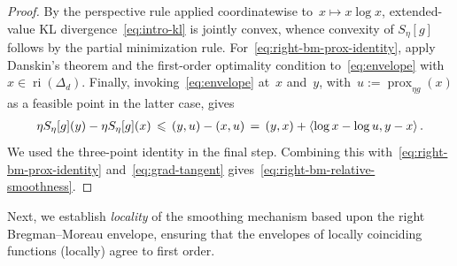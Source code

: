 \documentclass[11pt]{article}
\numberwithin{equation}{section}
\let\le\leqslant
\theoremstyle{remark}
\newcommand{\ri}{\operatorname{ri}}
\newcommand{\Env}{S}
\let\Div\relax\newcommand{\Div}{D_h}
\newcommand{\Simp}{\Delta_d}
\newcommand{\prox}{\operatorname{prox}}
\newcommand{\1}{\mathbf{1}}
\begin{document}
\begin{proof}
By the perspective rule applied coordinatewise to~$x \mapsto x \log x$, extended-value KL divergence~\eqref{eq:intro-kl} is jointly convex, whence convexity of $\Env_\eta[g]$ follows by the partial minimization rule. 
For~\eqref{eq:right-bm-prox-identity}, apply Danskin's theorem and the first-order optimality condition to~\eqref{eq:envelope} with~$x \in \ri(\Simp)$.
Finally, invoking~\eqref{eq:envelope} at~$x$ and~$y$, with~$u := \prox_{\eta g}(x)$ as a feasible point in the latter case, gives
\begin{equation}
\begin{aligned}
\label{eq:right-bm-one-step}
    \eta \Env_\eta[g](y)- \eta \Env_\eta[g](x)
    \,\le\,
    \Div(y,u)-\Div(x,u)
    \,=\,
    \Div(y,x)+ \left\langle \log x-\log u,y-x\right\rangle.
\end{aligned}
\end{equation}
We used the three-point identity in the final step.
Combining this with~\eqref{eq:right-bm-prox-identity} and~\eqref{eq:grad-tangent} gives~\eqref{eq:right-bm-relative-smoothness}.
\end{proof}

Next, we establish {\em locality} of the smoothing mechanism based upon the right Bregman--Moreau envelope, ensuring that the envelopes of locally coinciding functions (locally) agree to first order.
\end{document}
